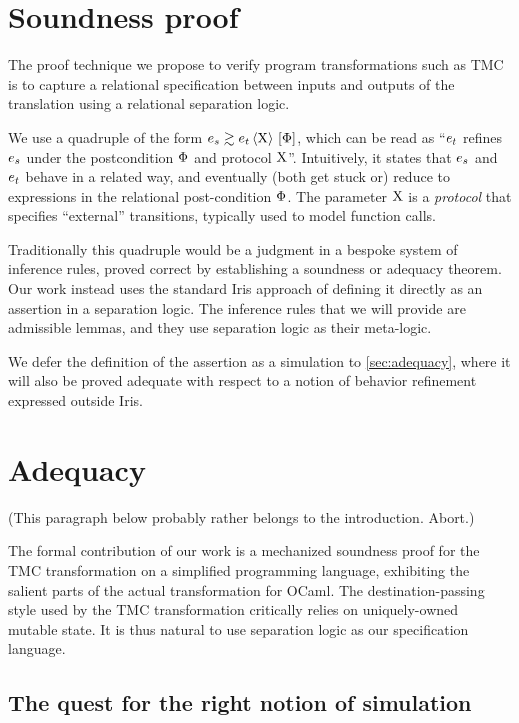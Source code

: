 \section{Soundness proof}

The proof technique we propose to verify program transformations such
as TMC is to capture a relational specification between inputs and
outputs of the translation using a relational separation logic.

We use a quadruple of the form $\iSim[\iProt]{\iPred}{\datalangExpr_s}{\datalangExpr_t}$, which can be read as ``$\datalangExpr_t$ refines $\datalangExpr_s$ under the postcondition $\Phi$ and protocol $\mathrm{X}$''. Intuitively, it states that $\datalangExpr_s$ and $\datalangExpr_t$ behave in a related way, and eventually (both get stuck or) reduce to expressions in the relational post-condition $\Phi$. The parameter $\mathrm{X}$ is a \emph{protocol} that specifies ``external'' transitions, typically used to model function calls.

Traditionally this quadruple would be a judgment in a bespoke system of inference rules, proved correct by establishing a soundness or adequacy theorem. Our work instead uses the standard Iris approach of defining it directly as an assertion in a separation logic. The inference rules that we will provide are admissible lemmas, and they use separation logic as their meta-logic.

We defer the definition of the assertion as a simulation to \cref{sec:adequacy}, where it will also be proved adequate with respect to a notion of behavior refinement expressed outside Iris.

\section{Adequacy}
\label{sec:soundness}
\label{sec:adequacy}

(This paragraph below probably rather belongs to the introduction. Abort.)

The formal contribution of our work is a mechanized soundness proof for the TMC transformation on a simplified programming language, exhibiting the salient parts of the actual transformation for OCaml.
%
The destination-passing style used by the TMC transformation critically relies on uniquely-owned mutable state.
%
It is thus natural to use separation logic as our specification language.

\subsection{The quest for the right notion of simulation}
\label{sec:howto-relation}

